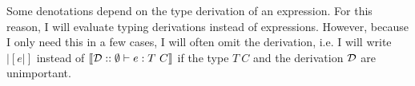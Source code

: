 \begin{defbox}
Some denotations depend on the type derivation of an expression. For this reason, I will evaluate typing derivations instead of expressions. However, because I only need this in a few cases, I will often omit the derivation, i.e. I will write $|[e|]$ instead of $|[\mathcal{D} :: \emptyset |- e : T\ C|]$ if the type $T\ C$ and the derivation $\mathcal{D}$ are unimportant.


\end{defbox}

